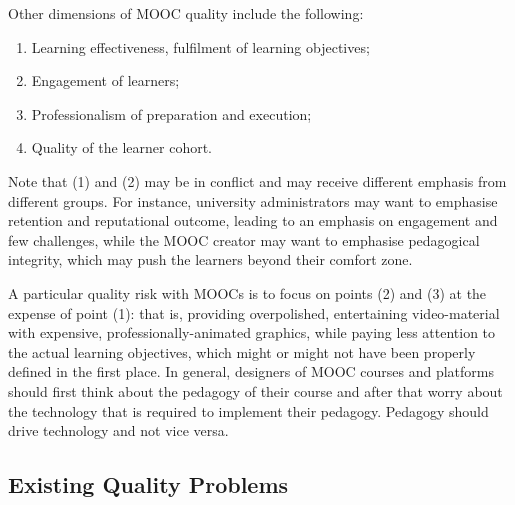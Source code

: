 Other dimensions of
MOOC quality include the following:

\begin{enumerate}

\item Learning effectiveness, fulfilment of learning objectives;

\item Engagement of learners;

\item Professionalism of preparation and execution;

\item Quality of the learner cohort.

\end{enumerate}


Note that (1) and (2) may be in conflict and may receive different
emphasis from different groups. For instance, university administrators
may want to emphasise retention and reputational
outcome, leading to an emphasis on engagement and few challenges,
while the MOOC
creator may want to emphasise pedagogical integrity, which may push the
learners beyond their comfort zone.

A particular quality risk with MOOCs is to focus on points (2) and (3)
at the expense of point (1): that is, providing overpolished,
entertaining video-material with expensive, professionally-animated
graphics, while paying less attention to
the actual learning objectives, which might or might not have 
been properly defined in the first place. In general, designers of MOOC
courses and platforms should first think about the pedagogy of their
course and after that worry about the technology that is required to
implement their pedagogy. Pedagogy should drive technology and not vice
versa.


\subsection{Existing Quality Problems}

